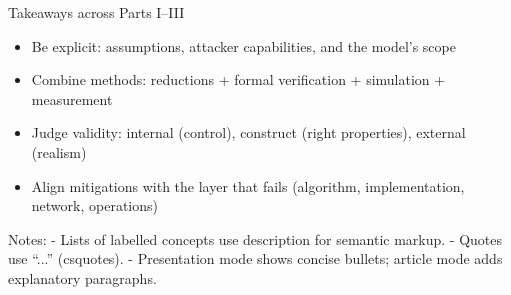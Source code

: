 
\begin{frame}
  \begin{block}{Takeaways across Parts I–III}
    \begin{itemize}
      \item Be explicit: assumptions, attacker capabilities, and the model’s scope
      \item Combine methods: reductions + formal verification + simulation + measurement
      \item Judge validity: internal (control), construct (right properties), external (realism)
      \item Align mitigations with the layer that fails (algorithm, implementation, network, operations)
    \end{itemize}
  \end{block}
\end{frame}

Notes:
- Lists of labelled concepts use description for semantic markup.
- Quotes use \enquote{...} (csquotes).
- Presentation mode shows concise bullets; article mode adds explanatory paragraphs.
